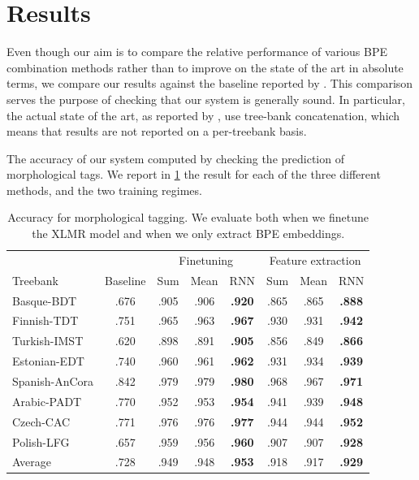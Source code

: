 \documentclass[11pt]{article}
\newcommand\citet{\cite}
\begin{document}
	
	\section{Results}
	\label{results}

        Even though our aim is to compare the relative performance of
        various BPE combination methods rather than to improve on the
        state of the art in absolute terms, we compare our results
        against the baseline reported by
        \citet{mccarthy2019sigmorphon}. This comparison serves the
        purpose of checking that our system is generally sound.  In
        particular, the actual state of the art, as reported by
        \citet{mccarthy2019sigmorphon}, use tree-bank concatenation,
        which means that results are not reported on a per-treebank
        basis.

        The accuracy of our system computed by checking the prediction
        of morphological tags. We report in \cref{tab:results_tokens}
        the result for each of the three different methods, and the
        two training regimes.

	\begin{table} %
	\centering
	\begin{tabular}{l|c|ccc|ccc}
		& & \multicolumn{3}{c}{Finetuning} & \multicolumn{3}{c}{Feature extraction} \\
		Treebank & Baseline & Sum & Mean & RNN & Sum & Mean & RNN \\
		\hline
        Basque-BDT      & .676 & .905 & .906 & \textbf{.920} & .865 & .865 & \textbf{.888} \\
		Finnish-TDT     & .751 & .965 & .963 & \textbf{.967} & .930 & .931 & \textbf{.942} \\ 
		Turkish-IMST    & .620 & .898 & .891 & \textbf{.905} & .856 & .849 & \textbf{.866}\\
		Estonian-EDT    & .740 & .960 & .961 & \textbf{.962} & .931 & .934 & \textbf{.939} \\
		Spanish-AnCora  & .842 & .979 & .979 & \textbf{.980} & .968 & .967 & \textbf{.971} \\
		Arabic-PADT     & .770 & .952 & .953 & \textbf{.954} & .941 & .939 & \textbf{.948} \\
		Czech-CAC       & .771 & .976 & .976 & \textbf{.977} & .944 & .944 & \textbf{.952} \\
		Polish-LFG      & .657 & .959 & .956 & \textbf{.960} & .907 & .907 & \textbf{.928} \\
        \hline
        Average         & .728 & .949 & .948 & \textbf{.953} & .918 & .917 & \textbf{.929} \\
	\end{tabular}
	\caption{\label{tab:results_tokens} Accuracy for morphological tagging. We evaluate both when we finetune the XLMR model and when we only extract BPE embeddings.}
	\end{table}
\end{document}
